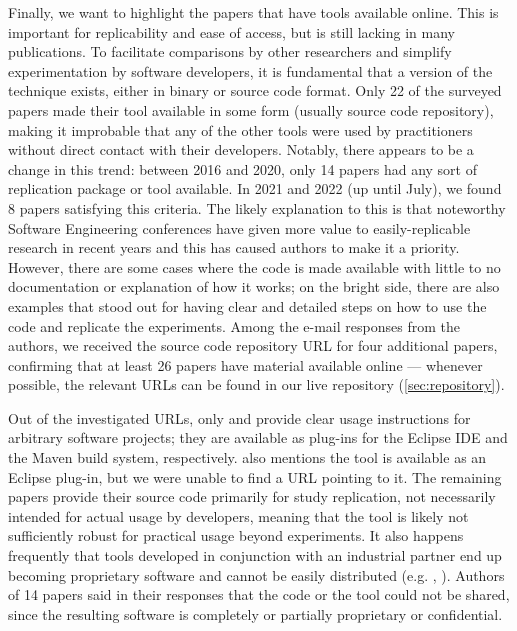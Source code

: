 Finally, we want to highlight the papers that have tools available online.
This is important for replicability and ease of access, but is still lacking in many publications.
To facilitate comparisons by other researchers and simplify experimentation by software developers, it is fundamental that a version of the technique exists, either in binary or source code format.
Only 22 of the surveyed papers made their tool available in some form (usually source code repository), making it improbable that any of the other tools were used by practitioners without direct contact with their developers.
Notably, there appears to be a change in this trend: between 2016 and 2020, only 14 papers had any sort of replication package or tool available.
In 2021 and 2022 (up until July), we found 8 papers satisfying this criteria.
The likely explanation to this is that noteworthy Software Engineering conferences have given more value to easily-replicable research in recent years and this has caused authors to make it a priority.
However, there are some cases where the code is made available with little to no documentation or explanation of how it works; on the bright side, there are also examples that stood out for having clear and detailed steps on how to use the code and replicate the experiments.
Among the e-mail responses from the authors, we received the source code repository URL for four additional papers, confirming that at least 26 papers have material available online --- whenever possible, the relevant URLs can be found in our live repository (\autoref{sec:repository}).

Out of the investigated URLs, only  and  provide clear usage instructions for arbitrary software projects; they are available as plug-ins for the Eclipse IDE and the Maven build system, respectively.
 also mentions the tool is available as an Eclipse plug-in, but we were unable to find a URL pointing to it.
The remaining papers provide their source code primarily for study replication, not necessarily intended for actual usage by developers, meaning that the tool is likely not sufficiently robust for practical usage beyond experiments.
It also happens frequently that tools developed in conjunction with an industrial partner end up becoming proprietary software and cannot be easily distributed (e.g. , ).
Authors of 14 papers said in their responses that the code or the tool could not be shared, since the resulting software is completely or partially proprietary or confidential.

